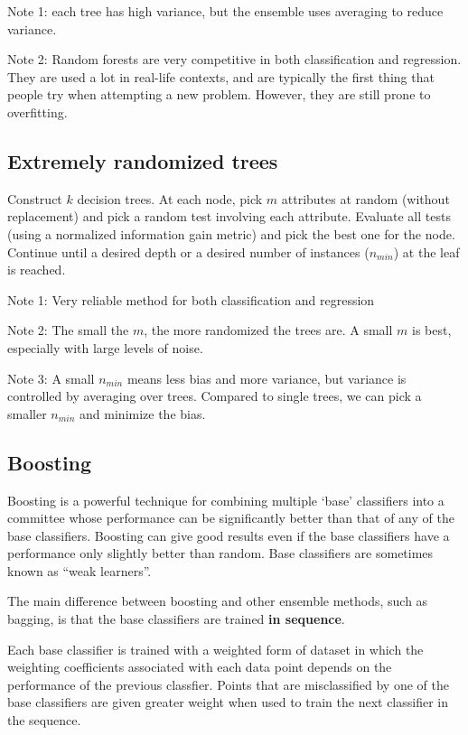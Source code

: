\documentclass[a4paper,12pt]{article}
\begin{document}
Note 1: each tree has high variance, but the ensemble uses averaging to reduce variance. 

Note 2: Random forests are very competitive in both classification and regression. They are used a lot in real-life contexts, and are typically the first thing that people try when attempting a new problem. However, they are still prone to overfitting. 

\subsection{Extremely randomized trees}

Construct $k$ decision trees. At each node, pick $m$ attributes at random (without replacement) and pick a random test involving each attribute. Evaluate all tests (using a normalized information gain metric) and pick the best one for the node. Continue until a desired depth or a desired number of instances ($n_{min}$) at the leaf is reached. 

Note 1: Very reliable method for both classification and regression

Note 2: The small the $m$, the more randomized the trees are. A small $m$ is best, especially with large levels of noise. 

Note 3: A small $n_{min}$ means less bias and more variance, but variance is controlled by averaging over trees. Compared to single trees, we can pick a smaller $n_{min}$ and minimize the bias. 

\subsection{Boosting}

Boosting is a powerful technique for combining multiple `base' classifiers into a committee whose performance can be significantly better than that of any of the base classifiers. Boosting can give good results even if the base classifiers have a performance only slightly better than random. Base classifiers are sometimes known as ``weak learners''. 

The main difference between boosting and other ensemble methods, such as bagging, is that the base classifiers are trained \textbf{in sequence}. 

Each base classifier is trained with a weighted form of dataset in which the weighting coefficients associated with each data point depends on the performance of the previous classfier. Points that are misclassified by one of the base classifiers are given greater weight when used to train the next classifier in the sequence. 
\end{document}
